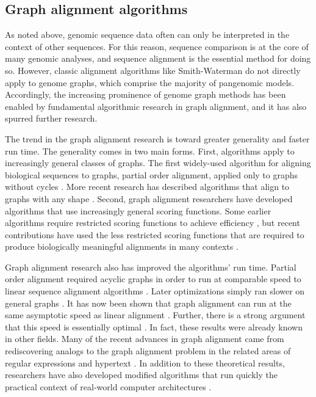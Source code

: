 %

\subsection{Graph alignment algorithms}

As noted above, genomic sequence data often can only be interpreted in the context of other sequences. 
For this reason, sequence comparison is at the core of many genomic analyses, and sequence alignment is the essential method for doing so. 
However, classic alignment algorithms like Smith-Waterman \cite{Smith_1981} do not directly apply to genome graphs, which comprise the majority of pangenomic models. 
Accordingly, the increasing prominence of genome graph methods has been enabled by fundamental algorithmic research in graph alignment, and it has also spurred further research.

The trend in the graph alignment research is toward greater generality and faster run time. 
The generality comes in two main forms. 
First, algorithms apply to increasingly general classes of graphs. 
The first widely-used algorithm for aligning biological sequences to graphs, partial order alignment, applied only to graphs without cycles \cite{Lee_2002, Grasso_2004}. 
More recent research has described algorithms that align to graphs with any shape \cite{Antipov_2015, Rautiainen_2017, Jain_2019a}. 
Second, graph alignment researchers have developed algorithms that use increasingly general scoring functions. 
Some earlier algorithms require restricted scoring functions to achieve efficiency \cite{Rautiainen_2017}, but recent contributions have used the less restricted scoring functions that are required to produce biologically meaningful alignments in many contexts \cite{Jain_2019a}.

Graph alignment research also has improved the algorithms' run time. 
Partial order alignment required acyclic graphs in order to run at comparable speed to linear sequence alignment algorithms \cite{Lee_2002}. 
Later optimizations simply ran slower on general graphs \cite{Kavya_2019}.
It has now been shown that graph alignment can run at the same asymptotic speed as linear alignment \cite{Jain_2019a}.
Further, there is a strong argument that this speed is essentially optimal \cite{Equi_2019}. 
In fact, these results were already known in other fields.
Many of the recent advances in graph alignment came from rediscovering analogs to the graph alignment problem in the related areas of regular expressions and hypertext \cite{Myers_1989, Amir_1997, Navarro_2000}. %
In addition to these theoretical results, researchers have also developed modified algorithms that run quickly the practical context of real-world computer architectures \cite{Suzuki_2018, Rautiainen_2019, Jain_2019b}.

